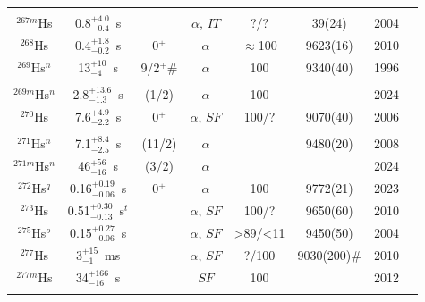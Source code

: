 \begin{center}
\begin{longtable}{c|ccccccl}
			&				&			&					&			& 				    &		&{\tiny\cite{Morita2004,Nishio2010,ZhangZY2012,Morita2015}}\\
$^{267m}$Hs	& 0.8$^{+4.0}_{-0.4}$~s&	&$\alpha$, $IT$     &?/?	 	&39(24)			    &2004	&{\tiny\cite{Folden2004,Morita2004}}\\
$^{268}$Hs	& 0.4$^{+1.8}_{-0.2}$~s&0$^+$&$\alpha$          &$\approx$100&9623(16)		    &2010	&{\tiny\cite{Nishio2010,Graeger2010}}\\
$^{269}$Hs$^n$& 13$^{+10}_{-4}$~s&9/2$^+$\#&$\alpha$		&100		&9340(40)		    &1996	&{\tiny\cite{Hofmann1996,Lazarev1996,Duellmann2002,Tuerler2003,Gaeggeler2004,Zweidorf2004}}\\
			&				&			&					&			& 				    &		&{\tiny\cite{Oganessian2009,Graeger2010,Tuerler2012,Sumita2013,Oganessian2024}}\\
$^{269m}$Hs$^n$& 2.8$^{+13.6}_{-1.3}$~s&(1/2)	&$\alpha$	&100		&	                &2024	&{\tiny\cite{Oganessian2024}}\\
$^{270}$Hs	& 7.6$^{+4.9}_{-2.2}$~s&0$^+$&$\alpha$, $SF$	&100/?		&9070(40)		    &2006	&{\tiny\cite{Duellmann2002,Tuerler2003,Gaeggeler2004,Dvorak2006,Dvorak2008,Oganessian2009}}\\
			&				&			&					&			& 				    &		&{\tiny\cite{Graeger2010,Oganessian2011a,Tuerler2012,Oganessian2013a}}\\
$^{271}$Hs$^n$& 7.1$^{+8.4}_{-2.5}$~s&(11/2)&$\alpha$		&			&9480(20)	        &2008	&{\tiny\cite{Dvorak2008,Oganessian2009,Graeger2010,Tuerler2013,Oganessian2024}}\\
$^{271m}$Hs$^n$&46$^{+56}_{-16}$~s&(3/2)&$\alpha$			&			&				    &2024	&{\tiny\cite{Oganessian2024}}\\
$^{272}$Hs$^q$& 0.16$^{+0.19}_{-0.06}$~s&0$^+$&$\alpha$	    &100		&9772(21)		    &2023	&{\tiny\cite{Oganessian2023}}\\
$^{273}$Hs	& 0.51$^{+0.30}_{-0.13}$~s$^t$&&$\alpha$, $SF$	&100/?      &9650(60)		    &2010	&{\tiny\cite{Ellison2010,Utyonkov2015,Oganessian2017,Utyonkov2018}}\\
$^{275}$Hs$^o$& 0.15$^{+0.27}_{-0.06}$~s&&$\alpha$, $SF$	&>89/<11	&9450(50)		    &2004	&{\tiny\cite{Oganessian2004a,Oganessian2022b}}\\
$^{277}$Hs	& 3$^{+15}_{-1}$~ms &		&$\alpha$, $SF$		&?/100		&9030(200)$\#$	    &2010	&{\tiny\cite{Duellmann2010,Gates2011,Hofmann2012,Khuyagbaatar2019,Cox2023}}\\
$^{277m}$Hs	& 34$^{+166}_{-16}$~s&	    &$SF$				&100		&				    &2012	&{\tiny\cite{Hofmann2012}}\\
\hline\\

\end{longtable}
\end{center}
